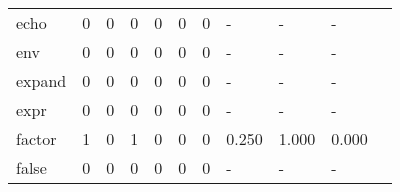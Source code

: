\begin{longtable}{lp{1.2cm}p{1.2cm}p{1.2cm}p{1.2cm}p{1.2cm}p{1.2cm}p{1.2cm}p{1.2cm}p{1.2cm}p{1.2cm}}
echo      &                                     0 &                                                  0 &                                                  0 &                                                  0 &                                                  0 &                                                  0 &                                             - &                                                  - &                                                  - \\
env       &                                     0 &                                                  0 &                                                  0 &                                                  0 &                                                  0 &                                                  0 &                                             - &                                                  - &                                                  - \\
expand    &                                     0 &                                                  0 &                                                  0 &                                                  0 &                                                  0 &                                                  0 &                                             - &                                                  - &                                                  - \\
expr      &                                     0 &                                                  0 &                                                  0 &                                                  0 &                                                  0 &                                                  0 &                                             - &                                                  - &                                                  - \\
factor    &                                     1 &                                                  0 &                                                  1 &                                                  0 &                                                  0 &                                                  0 &                                         0.250 &                                              1.000 &                                              0.000 \\
false     &                                     0 &                                                  0 &                                                  0 &                                                  0 &                                                  0 &                                                  0 &                                             - &                                                  - &                                                  - \\

\end{longtable}
